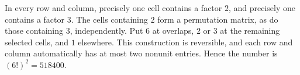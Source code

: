 In every row and column, precisely one cell contains a factor $2$, and precisely one contains a factor $3$. The cells containing $2$ form a permutation matrix, as do those containing $3$, independently. Put $6$ at overlaps, $2$ or $3$ at the remaining selected cells, and $1$ elsewhere. This construction is reversible, and each row and column automatically has at most two nonunit entries. Hence the number is $(6!)^2=\boxed{518400}$.

